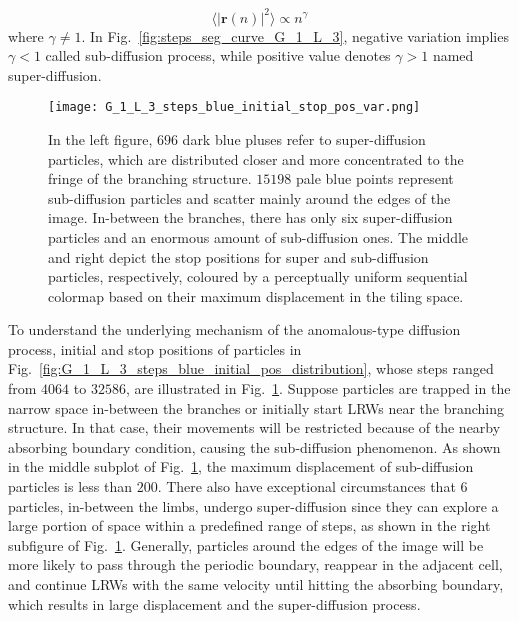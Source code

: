      \begin{equation}\label{eq:anomalous_diffusion}
       \langle \lvert \bm{r}(n) \lvert^2 \rangle \propto n^{\gamma}
     \end{equation}
where $\gamma \ne 1$. In Fig.~\ref{fig:steps_seg_curve_G_1_L_3},
negative variation implies $\gamma < 1$ called sub-diffusion process,
while positive value denotes $\gamma > 1$ named super-diffusion.

     
      \begin{figure}
         \centering
         \texttt{[image: G\_1\_L\_3\_steps\_blue\_initial\_stop\_pos\_var.png]}
         \caption{In the left figure, $696$ dark blue pluses refer to
           super-diffusion particles, which are distributed closer and
           more concentrated to the fringe of the branching
           structure. $15198$ pale blue points represent sub-diffusion
           particles and scatter mainly around the edges of the
           image. In-between the branches, there has only six
           super-diffusion particles and an enormous amount of
           sub-diffusion ones. The middle and right depict the stop
           positions for super and sub-diffusion particles,
           respectively, coloured by a perceptually uniform sequential
           colormap based on their maximum displacement in the tiling
           space.}
         \label{fig:G_1_L_3_var_initial_stop_pos}
      \end{figure}

To understand the underlying mechanism of the anomalous-type diffusion
process, initial and stop positions of particles in
Fig.~\ref{fig:G_1_L_3_steps_blue_initial_pos_distribution}, whose
steps ranged from $4064$ to $32586$, are illustrated in
Fig.~\ref{fig:G_1_L_3_var_initial_stop_pos}. Suppose particles are
trapped in the narrow space in-between the branches or initially start
LRWs near the branching structure. In that case, their movements will
be restricted because of the nearby absorbing boundary condition,
causing the sub-diffusion phenomenon. As shown in the middle subplot
of Fig.~\ref{fig:G_1_L_3_var_initial_stop_pos}, the maximum
displacement of sub-diffusion particles is less than $200$. There also
have exceptional circumstances that $6$ particles, in-between the
limbs, undergo super-diffusion since they can explore a large portion
of space within a predefined range of steps, as shown in the right
subfigure of Fig.~\ref{fig:G_1_L_3_var_initial_stop_pos}. Generally,
particles around the edges of the image will be more likely to pass
through the periodic boundary, reappear in the adjacent cell, and
continue LRWs with the same velocity until hitting the absorbing
boundary, which results in large displacement and the super-diffusion
process.
    

